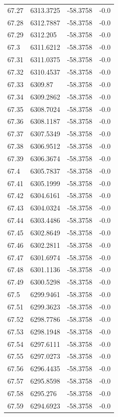\begin{table}[H]
\begin{tabular}{llll}
67.27 & 6313.3725 & -58.3758 & -0.0 \\
67.28 & 6312.7887 & -58.3758 & -0.0 \\
67.29 & 6312.205 & -58.3758 & -0.0 \\
67.3 & 6311.6212 & -58.3758 & -0.0 \\
67.31 & 6311.0375 & -58.3758 & -0.0 \\
67.32 & 6310.4537 & -58.3758 & -0.0 \\
67.33 & 6309.87 & -58.3758 & -0.0 \\
67.34 & 6309.2862 & -58.3758 & -0.0 \\
67.35 & 6308.7024 & -58.3758 & -0.0 \\
67.36 & 6308.1187 & -58.3758 & -0.0 \\
67.37 & 6307.5349 & -58.3758 & -0.0 \\
67.38 & 6306.9512 & -58.3758 & -0.0 \\
67.39 & 6306.3674 & -58.3758 & -0.0 \\
67.4 & 6305.7837 & -58.3758 & -0.0 \\
67.41 & 6305.1999 & -58.3758 & -0.0 \\
67.42 & 6304.6161 & -58.3758 & -0.0 \\
67.43 & 6304.0324 & -58.3758 & -0.0 \\
67.44 & 6303.4486 & -58.3758 & -0.0 \\
67.45 & 6302.8649 & -58.3758 & -0.0 \\
67.46 & 6302.2811 & -58.3758 & -0.0 \\
67.47 & 6301.6974 & -58.3758 & -0.0 \\
67.48 & 6301.1136 & -58.3758 & -0.0 \\
67.49 & 6300.5298 & -58.3758 & -0.0 \\
67.5 & 6299.9461 & -58.3758 & -0.0 \\
67.51 & 6299.3623 & -58.3758 & -0.0 \\
67.52 & 6298.7786 & -58.3758 & -0.0 \\
67.53 & 6298.1948 & -58.3758 & -0.0 \\
67.54 & 6297.6111 & -58.3758 & -0.0 \\
67.55 & 6297.0273 & -58.3758 & -0.0 \\
67.56 & 6296.4435 & -58.3758 & -0.0 \\
67.57 & 6295.8598 & -58.3758 & -0.0 \\
67.58 & 6295.276 & -58.3758 & -0.0 \\
67.59 & 6294.6923 & -58.3758 & -0.0 \\

\end{tabular}
\end{table}
